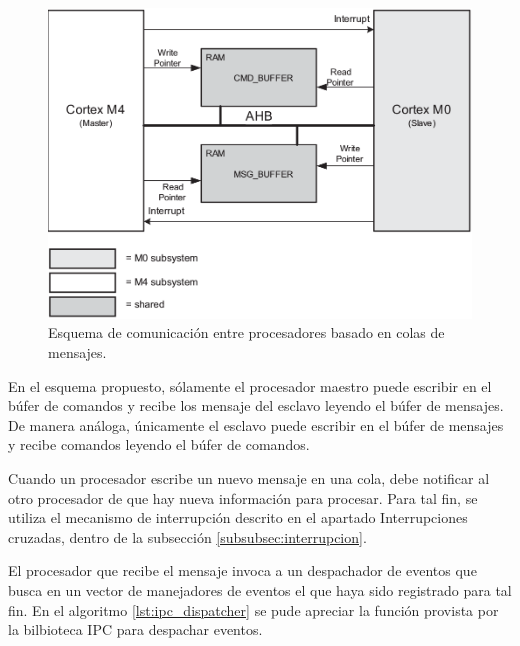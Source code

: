 \begin{figure}[ht]
	\centering
	\includegraphics[width=\textwidth]{./Figures/IPC.png}
	\caption[Esquema de comunicación entre procesadores]{Esquema de comunicación entre procesadores basado en colas de mensajes\protect\footnotemark.}
	\label{fig:IPC}
\end{figure}

\vspace{15px}
{}

En el esquema propuesto, sólamente el procesador maestro puede escribir en el búfer de comandos y recibe los mensaje del esclavo leyendo el búfer de mensajes.  De manera análoga, únicamente el esclavo puede escribir en el búfer de mensajes y recibe comandos leyendo el búfer de comandos.

Cuando un procesador escribe un nuevo mensaje en una cola, debe notificar al otro procesador de que hay nueva información para procesar. Para tal fin, se utiliza el mecanismo de interrupción descrito en el apartado Interrupciones cruzadas, dentro de la subsección \ref{subsubsec:interrupcion}.

El procesador que recibe el mensaje invoca a un despachador de eventos que busca en un vector de manejadores de eventos el que haya sido registrado para tal fin. En el algoritmo \ref{lst:ipc_dispatcher} se pude apreciar la función provista por la bilbioteca IPC para despachar eventos.

\vspace{10px}

